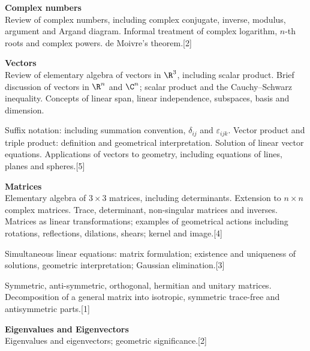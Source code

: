 \documentclass[a4paper]{article}
\begin{document}
\maketitle
{\small \noindent\textbf{Complex numbers}\\
Review of complex numbers, including complex conjugate, inverse, modulus, argument and Argand diagram. Informal treatment of complex logarithm, $n$-th roots and complex powers. de Moivre's theorem.\hspace*{\fill}[2]

\vspace{10pt}
\noindent\textbf{Vectors}\\
Review of elementary algebra of vectors in $\R^3$, including scalar product. Brief discussion of vectors in $\R^n$ and $\C^n$; scalar product and the Cauchy–Schwarz inequality. Concepts of linear span, linear independence, subspaces, basis and dimension.

\vspace{5pt}
\noindent Suffix notation: including summation convention, $\delta_{ij}$ and $\varepsilon_{ijk}$. Vector product and triple product: definition and geometrical interpretation. Solution of linear vector equations. Applications of vectors to geometry, including equations of lines, planes and spheres.\hspace*{\fill}[5]

\vspace{10pt}
\noindent\textbf{Matrices}\\
Elementary algebra of $3\times 3$ matrices, including determinants. Extension to $n\times n$ complex matrices. Trace, determinant, non-singular matrices and inverses. Matrices as linear transformations; examples of geometrical actions including rotations, reflections, dilations, shears; kernel and image.\hspace*{\fill}[4]

\vspace{5pt}
\noindent Simultaneous linear equations: matrix formulation; existence and uniqueness of solutions, geometric interpretation; Gaussian elimination.\hspace*{\fill}[3]

\vspace{5pt}
\noindent Symmetric, anti-symmetric, orthogonal, hermitian and unitary matrices. Decomposition of a general matrix into isotropic, symmetric trace-free and antisymmetric parts.\hspace*{\fill}[1]

\vspace{10pt}
\noindent\textbf{Eigenvalues and Eigenvectors}\\
Eigenvalues and eigenvectors; geometric significance.\hspace*{\fill}[2]

}
\end{document}
